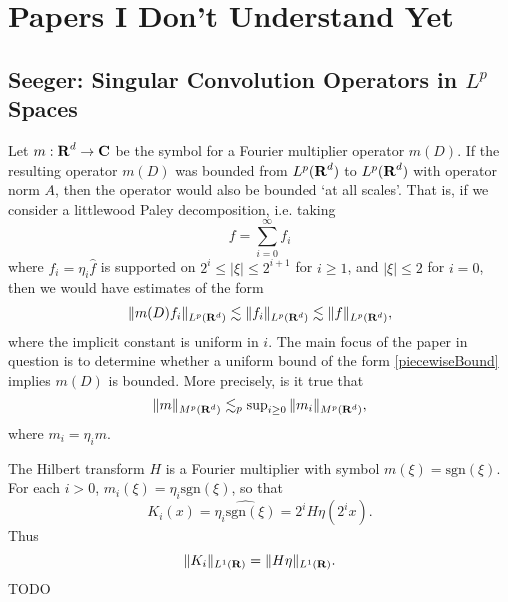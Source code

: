 \part{Papers I Don't Understand Yet}





\chapter{Seeger: Singular Convolution Operators in $L^p$ Spaces}

Let $m: \operatorname{\mathbf{R}}^d \to \operatorname{\mathbf{C}}$ be the symbol for a Fourier multiplier operator $m(D)$. If the resulting operator $m(D)$ was bounded from $L^p(\operatorname{\mathbf{R}}^d)$ to $L^p(\operatorname{\mathbf{R}}^d)$ with operator norm $A$, then the operator would also be bounded `at all scales'. That is, if we consider a littlewood Paley decomposition, i.e. taking
%
\[ f = \sum_{i = 0}^\infty f_i \]
%
where $\widehat{f_i} = \eta_i \widehat{f}$ is supported on $2^i \leq |\xi| \leq 2^{i+1}$ for $i \geq 1$, and $|\xi| \leq 2$ for $i = 0$, then we would have estimates of the form
%
\begin{equation} \label{piecewiseBound}
    \| m(D) f_i \|_{L^p(\operatorname{\mathbf{R}}^d)} \lesssim \| f_i \|_{L^p(\operatorname{\mathbf{R}}^d)} \lesssim \| f \|_{L^p(\operatorname{\mathbf{R}}^d)},
\end{equation}
%
where the implicit constant is uniform in $i$. The main focus of the paper in question is to determine whether a uniform bound of the form \eqref{piecewiseBound} implies $m(D)$ is bounded. More precisely, is it true that
%
\begin{equation} \label{operatorbound}
    \| m \|_{M^p(\operatorname{\mathbf{R}}^d)} \lesssim_p \sup\nolimits_{i \geq 0} \| m_i \|_{M^p(\operatorname{\mathbf{R}}^d)},
\end{equation}
%
where $m_i = \eta_i m$.

The Hilbert transform $H$ is a Fourier multiplier with symbol $m(\xi) = \text{sgn}(\xi)$. For each $i > 0$, $m_i(\xi) = \eta_i \text{sgn}(\xi)$, so that
%
\[ K_i(x) = \widehat{\eta_i \text{sgn}(\xi)} = 2^i H \eta(2^i x). \]
%
Thus
%
\[ \| K_i \|_{L^1(\operatorname{\mathbf{R}})} = \| H \eta \|_{L^1(\operatorname{\mathbf{R}})}. \]
%
TODO

